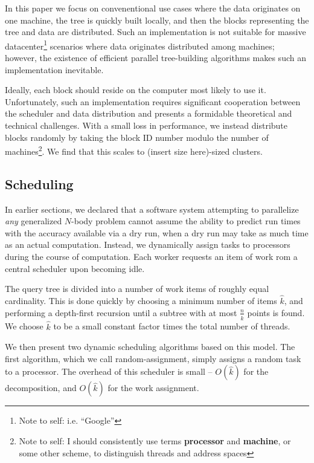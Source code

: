 \documentclass[times, leqno,twocolumn]{article}
\newcommand{\authornote}[1]{\footnote{Note to self: #1}}
\newcommand{\authorsnote}[1]{\authornote{#1}}
\newcommand{\defterm}[1]{{\bf #1}}
\begin{document}
In this paper we focus on convenentional use cases where the data originates on one machine, the tree is quickly built locally, and then the blocks representing the tree and data are distributed.
Such an implementation is not suitable for massive datacenter\authorsnote{i.e. ``Google''} scenarios where data originates distributed among machines; however, the existence of efficient parallel tree-building algorithms \cite{alfuraih00parallel} makes such an implementation inevitable.

Ideally, each block should reside on the computer most likely to use it.
Unfortunately, such an implementation requires significant cooperation between the scheduler and data distribution and presents a formidable theoretical and technical challenges.
With a small loss in performance, we instead distribute blocks randomly by taking the block ID number modulo the number of machines\authorsnote{I should consistently use terms \defterm{processor} and \defterm{machine}, or some other scheme, to distinguish threads and address spaces}.
We find that this scales to (insert size here)-sized clusters.

\subsection{Scheduling}

In earlier sections, we declared that a software system attempting to parallelize {\it any} generalized $N$-body problem cannot assume the ability to predict run times with the accuracy available via a dry run, when a dry run may take as much time as an actual computation.
Instead, we dynamically assign tasks to processors during the course of computation.
Each worker requests an item of work rom a central scheduler upon becoming idle.

The query tree is divided into a number of work items of roughly equal cardinality.
This is done quickly by choosing a minimum number of items $\hat{k}$, and performing a depth-first recursion until a subtree with at most $\frac{n}{\hat{k}}$ points is found.
We choose $\hat{k}$ to be a small constant factor times the total number of threads.

We then present two dynamic scheduling algorithms based on this model.
The first algorithm, which we call random-assignment, simply assigns a random task to a processor.
The overhead of this scheduler is small -- $O(\hat{k})$ for the decomposition, and $O(\hat{k})$ for the work assignment.
\end{document}
